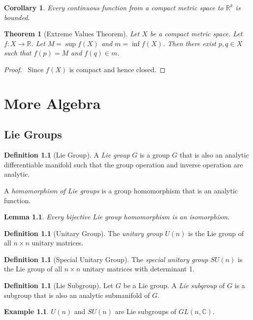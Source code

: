 \documentclass{book}
\let\qed\relax
\newtheorem{cor}{Corollary}[prop]
\newtheorem{thm}[prop]{Theorem}
\newtheorem{lm}[prop]{Lemma}
\theoremstyle{definition}
\newtheorem{df}[prop]{Definition}
\newtheorem{ex}[prop]{Example}
\begin{document}
\begin{cor}
Every continuous function from a compact metric space to $\mathbb{R}^k$ is bounded.
\end{cor}

\begin{thm}[Extreme Values Theorem]
Let $X$ be a compact metric space. Let $f : X \rightarrow \mathbb{R}$. Let $M = \sup f(X)$ and $m = \inf f(X)$. Then there exist $p,q \in X$ such that $f(p) = M$ and $f(q) \in m$.
\end{thm}

\begin{proof}
\pf\ Since $f(X)$ is compact and hence closed. \qed
\end{proof}

\part{More Algebra}

\chapter{Lie Groups}

\begin{df}[Lie Group]
A \emph{Lie group} $G$ is a group $G$ that is also an analytic differentiable manifold such that the group operation and inverse operation are analytic.

A \emph{homomorphism of Lie groups} is a group homomorphism that is an analytic function.
\end{df}

\begin{lm}
Every bijective Lie group homomorphism is an isomorphism.
\end{lm}


\begin{df}[Unitary Group]
The \emph{unitary group} $U(n)$ is the Lie group of all $n \times n$ unitary matrices.
\end{df}

\begin{df}[Special Unitary Group]
The \emph{special unitary group} $SU(n)$ is the Lie group of all $n \times n$ unitary matrices with determinant 1.
\end{df}

\begin{df}[Lie Subgroup]
Let $G$ be a Lie group. A \emph{Lie subgroup} of $G$ is a subgroup that is also an analytic submanifold of $G$.
\end{df}

\begin{ex}
$U(n)$ and $SU(n)$ are Lie subgroups of $GL(n, \mathbb{C})$.
\end{ex}
\end{document}
